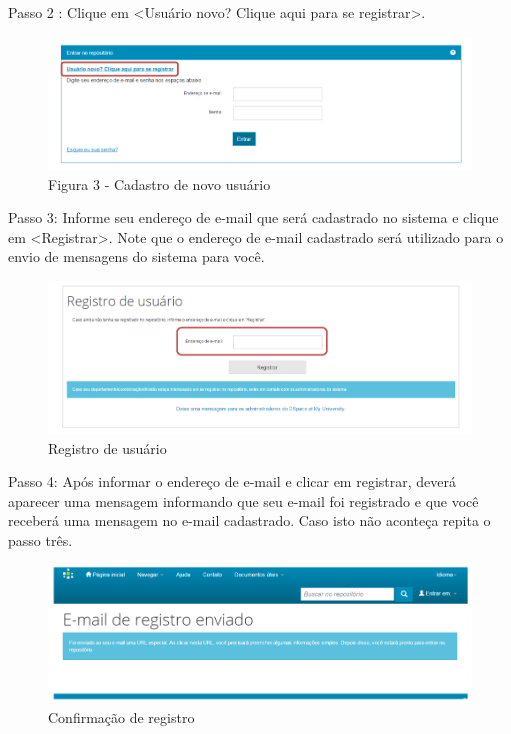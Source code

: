 \documentclass[12pt,hidelinks]{article}
\begin{document}
       Passo 2 : Clique em <Usuário novo? Clique aqui para se registrar>. 
       
       \begin{figure}[!htp]
                \centering
                \includegraphics[scale=0.6]{figura/Figura3.png}
                \caption{Figura 3 - Cadastro de novo usuário}
            \label{Rotulo}
        \end{figure}  
        
    
        Passo 3: Informe seu endereço de e-mail que será cadastrado no sistema e clique em <Registrar>. Note que o endereço de e-mail cadastrado será utilizado para o envio de mensagens do sistema para você.
        
        \begin{figure}[!htp]
                \centering
                \includegraphics[scale=0.6]{figura/Figura4.png}
                \caption{Registro de usuário}
            \label{Rotulo}
        \end{figure}
\newpage        
        Passo 4: Após informar o endereço de e-mail e clicar em registrar, deverá aparecer uma mensagem informando que seu e-mail foi registrado e que você receberá uma mensagem no e-mail cadastrado. Caso isto não aconteça repita o passo três.
        
        \begin{figure}[!htp]
                \centering
                \includegraphics[scale=0.6]{figura/Figura5.png}
                \caption{Confirmação de registro}
            \label{Rotulo}
        \end{figure}
        
\end{document}
